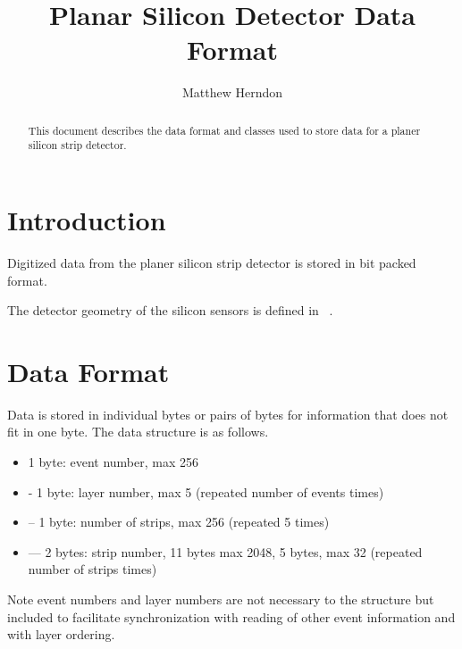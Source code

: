 \documentclass[aps,prd,superscriptaddress,floatfix]{revtex4}
\begin{document}


\title{  
\vspace{0.5cm}
Planar Silicon Detector Data Format
}

\author {Matthew Herndon}

\address{University of Wisconsin, Madison, Wisconsin, Fermi
  National Accelerator Laboratory, Illinois}


\begin{abstract}
\vskip 0.5cm
\noindent
This document describes the data format and classes used
to store data for a planer silicon strip detector.
\end{abstract}
\maketitle


\vspace{0.3cm}

\section{Introduction}
Digitized data from the planer silicon strip detector is stored
in bit packed format.

The detector geometry of the silicon sensors is defined in ~\cite{detectorGeometry}.


\section{Data Format}
Data is stored in individual bytes or pairs of bytes for information
that does not fit in one byte.  The data structure is as follows.

\begin{itemize}
\item  1 byte: event number, max 256
\item - 1 byte: layer number, max 5 (repeated number of events times)
\item -- 1 byte: number of strips, max 256 (repeated 5 times)
\item --- 2 bytes: strip number, 11 bytes max 2048, 5 bytes, max 32
  (repeated number of strips times)
\end{itemize}

Note event numbers and layer numbers are not necessary to the
structure but included to facilitate synchronization with reading of
other event information and with layer ordering.
\end{document}
